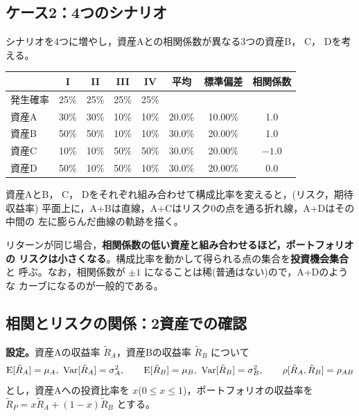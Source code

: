 \vspace{18pt}

\subsection{ケース2：4つのシナリオ}

\begin{example}
シナリオを4つに増やし，資産Aとの相関係数が異なる3つの資産B， C， Dを考える。
\vspace{0.9em}
\begin{center}
\small
\begin{tabular}{lccccccc}
\toprule
 & I & II & III & IV & 平均 & 標準偏差 & 相関係数\footnotemark\\
\midrule
発生確率 & 25\% & 25\% & 25\% & 25\% & & &\\
資産A & 30\% & 30\% & 10\% & 10\% & 20.0\% & 10.00\% & 1.0\\
資産B & 50\% & 50\% & 10\% & 10\% & 30.0\% & 20.00\% & 1.0\\
資産C & 10\% & 10\% & 50\% & 50\% & 30.0\% & 20.00\% & $-1.0$\\
資産D & 50\% & 10\% & 50\% & 10\% & 30.0\% & 20.00\% & 0.0\\
\bottomrule
\end{tabular}
\end{center}
\vspace{0.9em}
資産AとB， C， Dをそれぞれ組み合わせて構成比率を変えると，(リスク，期待収益率)
平面上に，A+Bは直線，A+Cはリスク0の点を通る折れ線，A+Dはその中間の
左に膨らんだ曲線の軌跡を描く。
\end{example}

\begin{keypoint}
リターンが同じ場合，\textbf{相関係数の低い資産と組み合わせるほど，ポートフォリオの
リスクは小さくなる}。構成比率を動かして得られる点の集合を\textbf{投資機会集合}と
呼ぶ。なお，相関係数が $\pm 1$ になることは稀(普通はない)ので，A+Dのような
カーブになるのが一般的である。
\end{keypoint}

\subsection{相関とリスクの関係：2資産での確認}

\textbf{設定。}資産Aの収益率 $\tilde R_A$，資産Bの収益率 $\tilde R_B$ について
\[
\E[\tilde R_A] = \mu_A,\ \Var[\tilde R_A] = \sigma_A^2,\qquad
\E[\tilde R_B] = \mu_B,\ \Var[\tilde R_B] = \sigma_B^2,\qquad
\rho[\tilde R_A, \tilde R_B] = \rho_{AB}
\]
とし，資産Aへの投資比率を $x$($0\leq x\leq 1$)，ポートフォリオの収益率を
$\tilde R_P = x\tilde R_A + (1-x)\tilde R_B$ とする。

